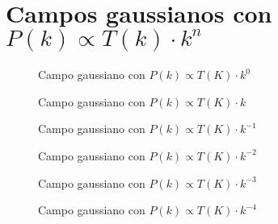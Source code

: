 \section{Campos gaussianos con \texorpdfstring{\(P(k)\propto T(k)\cdot k^n\)}{espectro de potencias del CMB}}
\begin{figure}
  \centering
  {}
  \caption{Campo gaussiano con \(P(k)\propto T(K)\cdot k^0\)}
  \label{fig::tf0}
\end{figure}
\begin{figure}
  \centering
  {}
  \caption{Campo gaussiano con \(P(k)\propto T(K)\cdot k\)}
  \label{fig::tf1}
\end{figure}
\begin{figure}
  \centering
  {}
  \caption{Campo gaussiano con \(P(k)\propto T(K)\cdot k^{-1}\)}
  \label{fig::tfmenos1}
\end{figure}
\begin{figure}
  \centering
  {}
  \caption{Campo gaussiano con \(P(k)\propto T(K)\cdot k^{-2}\)}
  \label{fig::tfmenos2}
\end{figure}
\begin{figure}
  \centering
  {}
  \caption{Campo gaussiano con \(P(k)\propto T(K)\cdot k^{-3}\)}
  \label{fig::tfmenos3}
\end{figure}
\begin{figure}
  \centering
  {}
  \caption{Campo gaussiano con \(P(k)\propto T(K)\cdot k^{-4}\)}
  \label{fig::tfmenos4}
\end{figure}
\cleardoublepage
